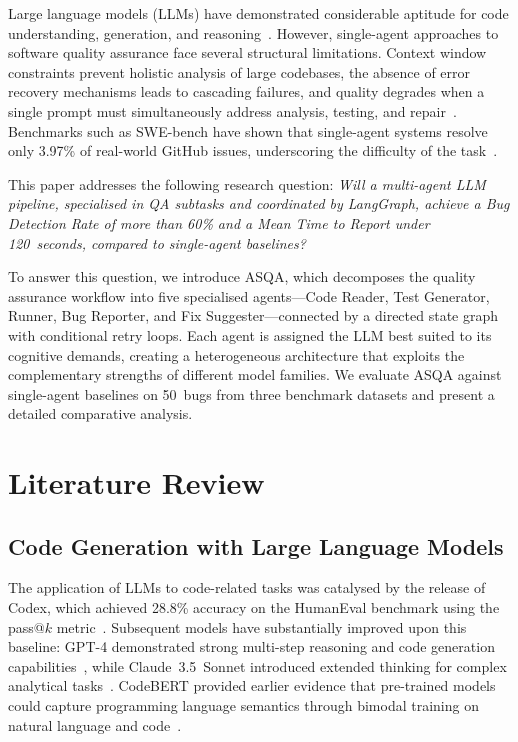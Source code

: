\documentclass[conference]{IEEEtran}
\begin{document}
Large language models (LLMs) have demonstrated considerable aptitude for code understanding, generation, and reasoning~\cite{chen2021,openai2023gpt4}. However, single-agent approaches to software quality assurance face several structural limitations. Context window constraints prevent holistic analysis of large codebases, the absence of error recovery mechanisms leads to cascading failures, and quality degrades when a single prompt must simultaneously address analysis, testing, and repair~\cite{liu2023}. Benchmarks such as SWE-bench have shown that single-agent systems resolve only 3.97\% of real-world GitHub issues, underscoring the difficulty of the task~\cite{jimenez2024}.

This paper addresses the following research question: \textit{Will a multi-agent LLM pipeline, specialised in QA subtasks and coordinated by LangGraph, achieve a Bug Detection Rate of more than 60\% and a Mean Time to Report under 120~seconds, compared to single-agent baselines?}

To answer this question, we introduce ASQA, which decomposes the quality assurance workflow into five specialised agents---Code Reader, Test Generator, Runner, Bug Reporter, and Fix Suggester---connected by a directed state graph with conditional retry loops. Each agent is assigned the LLM best suited to its cognitive demands, creating a heterogeneous architecture that exploits the complementary strengths of different model families. We evaluate ASQA against single-agent baselines on 50~bugs from three benchmark datasets and present a detailed comparative analysis.

\section{Literature Review}

\subsection{Code Generation with Large Language Models}

The application of LLMs to code-related tasks was catalysed by the release of Codex, which achieved 28.8\% accuracy on the HumanEval benchmark using the pass@$k$ metric~\cite{chen2021}. Subsequent models have substantially improved upon this baseline: GPT-4 demonstrated strong multi-step reasoning and code generation capabilities~\cite{openai2023gpt4}, while Claude~3.5~Sonnet introduced extended thinking for complex analytical tasks~\cite{anthropic2024claude}. CodeBERT provided earlier evidence that pre-trained models could capture programming language semantics through bimodal training on natural language and code~\cite{feng2020}.
\end{document}
